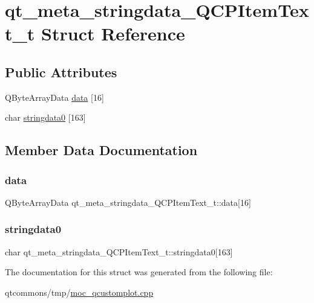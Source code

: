 \hypertarget{structqt__meta__stringdata___q_c_p_item_text__t}{}\section{qt\+\_\+meta\+\_\+stringdata\+\_\+\+Q\+C\+P\+Item\+Text\+\_\+t Struct Reference}
\label{structqt__meta__stringdata___q_c_p_item_text__t}
\subsection*{Public Attributes}
\begin{DoxyCompactItemize}
\item 
Q\+Byte\+Array\+Data \mbox{\hyperlink{structqt__meta__stringdata___q_c_p_item_text__t_a130c44d0975b8c3615445811c48edcab}{data}} \mbox{[}16\mbox{]}
\item 
char \mbox{\hyperlink{structqt__meta__stringdata___q_c_p_item_text__t_ab2e92c59ac0dced63f1fc1f4cc75cbc7}{stringdata0}} \mbox{[}163\mbox{]}
\end{DoxyCompactItemize}


\subsection{Member Data Documentation}
\mbox{\label{structqt__meta__stringdata___q_c_p_item_text__t_a130c44d0975b8c3615445811c48edcab}} 
\subsubsection{\texorpdfstring{data}{data}}
{\footnotesize\ttfamily Q\+Byte\+Array\+Data qt\+\_\+meta\+\_\+stringdata\+\_\+\+Q\+C\+P\+Item\+Text\+\_\+t\+::data\mbox{[}16\mbox{]}}

\mbox{\label{structqt__meta__stringdata___q_c_p_item_text__t_ab2e92c59ac0dced63f1fc1f4cc75cbc7}} 
\subsubsection{\texorpdfstring{stringdata0}{stringdata0}}
{\footnotesize\ttfamily char qt\+\_\+meta\+\_\+stringdata\+\_\+\+Q\+C\+P\+Item\+Text\+\_\+t\+::stringdata0\mbox{[}163\mbox{]}}



The documentation for this struct was generated from the following file\+:\begin{DoxyCompactItemize}
\item 
qtcommons/tmp/\mbox{\hyperlink{moc__qcustomplot_8cpp}{moc\+\_\+qcustomplot.\+cpp}}\end{DoxyCompactItemize}
